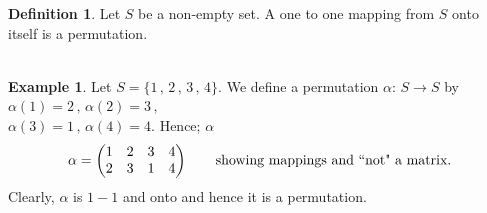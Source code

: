 \documentclass[11pt,a4paper]{article}
\theoremstyle{definition}
\newtheorem{defn}[thm]{Definition}
\newtheorem{exa}[thm]{Example}
\begin{document}
\begin{defn}
Let $S$ be a non-empty set. A one to one mapping from $S$  onto itself is a  permutation.\\\\
\end{defn}



\begin{exa}
Let $S = \{1\, , \, 2\, , \, 3\,  , \, 4\}$. We define a permutation $\alpha: \, S\longrightarrow S$ by $\alpha(1) = 2\, , \, \alpha(2) = 3\, ,$\\ $\alpha(3) = 1\, , \, \alpha(4) = 4$. Hence; $\alpha$
$$\alpha = \begin{pmatrix}
1 & 2 & 3 & 4\\
2 & 3 & 1 & 4\\
\end{pmatrix} \hspace{0.7cm}\text{showing mappings and ``not" a matrix.}$$
Clearly, $\alpha$ is $1-1$ and onto and hence it is a permutation.\\\\
\end{exa}
\end{document}
